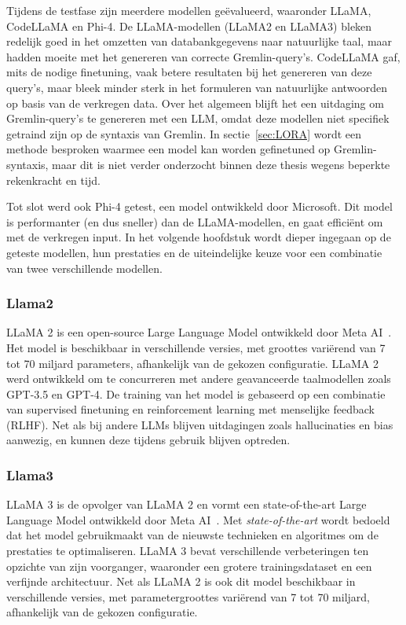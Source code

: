 Tijdens de testfase zijn meerdere modellen geëvalueerd, waaronder LLaMA, CodeLLaMA en Phi-4.
De LLaMA-modellen (LLaMA2 en LLaMA3) bleken redelijk goed in het omzetten van databankgegevens naar natuurlijke taal, maar hadden moeite met het genereren van correcte Gremlin-query's.
CodeLLaMA gaf, mits de nodige finetuning, vaak betere resultaten bij het genereren van deze query's, maar bleek minder sterk in het formuleren van natuurlijke antwoorden op basis van de verkregen data.
Over het algemeen blijft het een uitdaging om Gremlin-query's te genereren met een LLM, omdat deze modellen niet specifiek getraind zijn op de syntaxis van Gremlin.
In sectie~\ref{sec:LORA} wordt een methode besproken waarmee een model kan worden gefinetuned op Gremlin-syntaxis, maar dit is niet verder onderzocht binnen deze thesis wegens beperkte rekenkracht en tijd.

Tot slot werd ook Phi-4 getest, een model ontwikkeld door Microsoft. Dit model is performanter (en dus sneller) dan de LLaMA-modellen, en gaat efficiënt om met de verkregen input.
In het volgende hoofdstuk wordt dieper ingegaan op de geteste modellen, hun prestaties en de uiteindelijke keuze voor een combinatie van twee verschillende modellen.

\subsubsection{Llama2}
LLaMA 2 is een open-source Large Language Model ontwikkeld door Meta AI~\autocite{llama2}. 
Het model is beschikbaar in verschillende versies, met groottes variërend van 7 tot 70 miljard parameters, afhankelijk van de gekozen configuratie.
LLaMA 2 werd ontwikkeld om te concurreren met andere geavanceerde taalmodellen zoals GPT-3.5 en GPT-4.
De training van het model is gebaseerd op een combinatie van supervised finetuning en reinforcement learning met menselijke feedback (RLHF).
Net als bij andere LLMs blijven uitdagingen zoals hallucinaties en bias aanwezig, en kunnen deze tijdens gebruik blijven optreden.

\subsubsection{Llama3}
LLaMA 3 is de opvolger van LLaMA 2 en vormt een state-of-the-art Large Language Model ontwikkeld door Meta AI~\autocite{Meta2024}. 
Met \emph{state-of-the-art} wordt bedoeld dat het model gebruikmaakt van de nieuwste technieken en algoritmes om de prestaties te optimaliseren.
LLaMA 3 bevat verschillende verbeteringen ten opzichte van zijn voorganger, waaronder een grotere trainingsdataset en een verfijnde architectuur.
Net als LLaMA 2 is ook dit model beschikbaar in verschillende versies, met parametergroottes variërend van 7 tot 70 miljard, afhankelijk van de gekozen configuratie.

